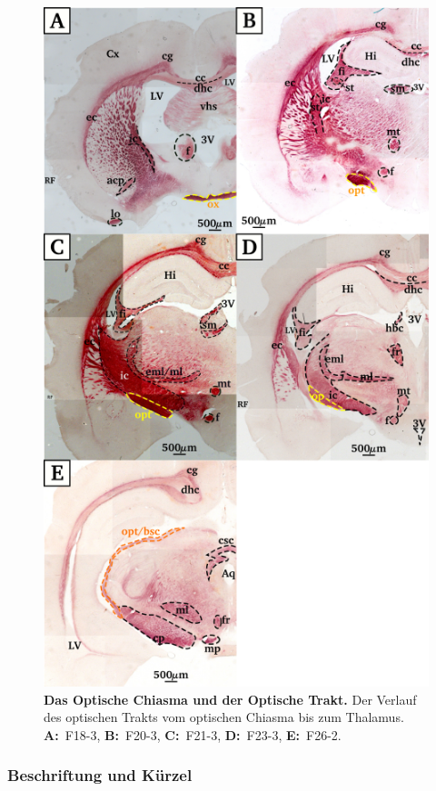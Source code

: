 \documentclass[12pt,a4paper,pdftex]{article}
\begin{document}
\begin{figure}[H]
    \centering
    \includegraphics{pictures/visual/optic_tract.png}
    \caption[Das Optische Chiasma und der Optische Trakt]{\textbf{Das Optische Chiasma und der Optische Trakt.} Der Verlauf des optischen Trakts vom optischen Chiasma bis zum Thalamus. \textbf{A:}~F18-3, \textbf{B:}~F20-3, \textbf{C:}~F21-3, \textbf{D:}~F23-3, \textbf{E:}~F26-2.}
    \label{fig:optic_tract}
\end{figure}

\subsubsection*{Beschriftung und Kürzel}
\end{document}
